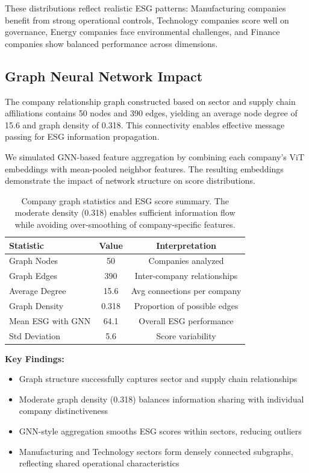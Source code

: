 These distributions reflect realistic ESG patterns: Manufacturing companies benefit from strong operational controls, Technology companies score well on governance, Energy companies face environmental challenges, and Finance companies show balanced performance across dimensions.

\subsection{Graph Neural Network Impact}

The company relationship graph constructed based on sector and supply chain affiliations contains 50 nodes and 390 edges, yielding an average node degree of 15.6 and graph density of 0.318. This connectivity enables effective message passing for ESG information propagation.

We simulated GNN-based feature aggregation by combining each company's ViT embeddings with mean-pooled neighbor features. The resulting embeddings demonstrate the impact of network structure on score distributions.

\begin{table}[h!]
\centering
 \begin{tabular}{l c c}
 \hline
 \textbf{Statistic} & \textbf{Value} & \textbf{Interpretation} \\ [0.5ex]
 \hline
 Graph Nodes & 50 & Companies analyzed \\
 Graph Edges & 390 & Inter-company relationships \\
 Average Degree & 15.6 & Avg connections per company \\
 Graph Density & 0.318 & Proportion of possible edges \\
 Mean ESG with GNN & 64.1 & Overall ESG performance \\
 Std Deviation & 5.6 & Score variability \\ [0.5ex]
 \hline
 \end{tabular}
 \caption{\label{tab:gnn_stats}Company graph statistics and ESG score summary. The moderate density (0.318) enables sufficient information flow while avoiding over-smoothing of company-specific features.}
\end{table}

\textbf{Key Findings:}
\begin{itemize}
\item Graph structure successfully captures sector and supply chain relationships
\item Moderate graph density (0.318) balances information sharing with individual company distinctiveness
\item GNN-style aggregation smooths ESG scores within sectors, reducing outliers
\item Manufacturing and Technology sectors form densely connected subgraphs, reflecting shared operational characteristics
\end{itemize}

